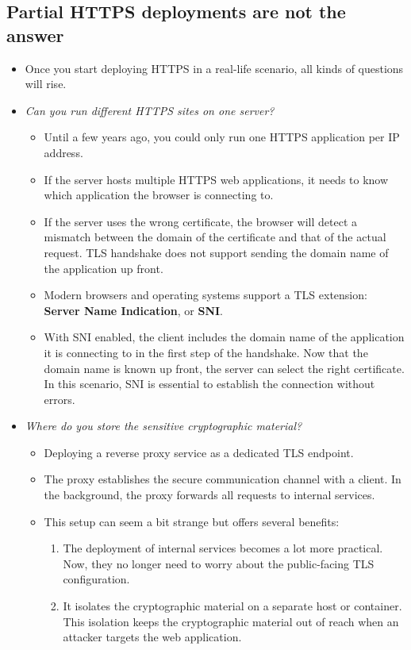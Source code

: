 \documentclass[../main.tex]{subfiles}
\begin{document}
\subsection{Partial HTTPS deployments are not the answer}
\begin{itemize}
\item Once you start deploying HTTPS in a real-life scenario, all kinds of questions will rise.
\item \emph{Can you run different HTTPS sites on one server?}
\begin{itemize}
\item Until a few years ago, you could only run one HTTPS application per IP address.
\item If the server hosts multiple HTTPS web applications, it needs to know which application the browser is connecting to.
\item If the server uses the wrong certificate, the browser will detect a mismatch between the domain of the certificate and that of the actual request. TLS handshake does not support sending the domain name of the application up front.
\item Modern browsers and operating systems support a TLS extension: \textbf{Server Name Indication}, or \textbf{SNI}.
\item With SNI enabled, the client includes the domain name of the application it is connecting to in the first step of the handshake. Now that the domain name is known up front, the server can select the right certificate. In this scenario, SNI is essential to establish the connection without errors.
\end{itemize}
\item \emph{Where do you store the sensitive cryptographic material?}
\begin{itemize}
\item Deploying a reverse proxy service as a dedicated TLS endpoint.
\item The proxy establishes the secure communication channel with a client. In the background, the proxy forwards all requests to internal services.
\item This setup can seem a bit strange but offers several benefits:
\begin{enumerate}
\item The deployment of internal services becomes a lot more practical. Now, they no longer need to worry about the public-facing TLS configuration.
\item It isolates the cryptographic material on a separate host or container. This isolation keeps the cryptographic material out of reach when an attacker targets the web application.

\end{enumerate}
\end{itemize}
\end{itemize}
\end{document}
